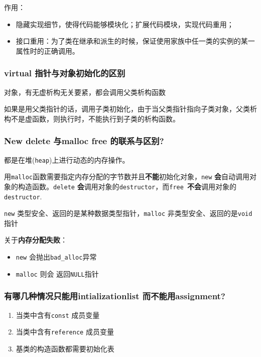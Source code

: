 \documentclass[UTF8,a4paper,8pt]{ctexart}
\begin{document}
			作用：
			\begin{itemize}[itemindent = 1em]
				\item  隐藏实现细节，使得代码能够模块化；扩展代码模块，实现代码重用；
				\item  接口重用：为了类在继承和派生的时候，保证使用家族中任一类的实例的某一属性时的正确调用。
			\end{itemize}
		
		\subsubsection{virtual 指针与对象初始化的区别}
			对象，有无虚析构无关要紧，都会调用父类析构函数
			
			如果是用父类指针的话，调用子类初始化，由于当父类指针指向子类对象，父类析构不是虚函数，则执行时，不能执行到子类的析构函数。
			
		\subsubsection{New delete 与malloc free 的联系与区别?}
			都是在堆(\verb|heap|)上进行动态的内存操作。
			
			用\verb|malloc|函数需要指定内存分配的字节数并且\textbf{不能}初始化对象，\verb|new| \textbf{会}自动调用对象的构造函数。\verb|delete| \textbf{会}调用对象的\verb|destructor|，而\verb|free |\textbf{不会}调用对象的\verb|destructor|.
			
			\verb|new| 类型安全、返回的是某种数据类型指针，\verb|malloc| 非类型安全、返回的是\verb|void|指针
			
			关于\textbf{内存分配失败}：
				\begin{itemize}[itemindent = 2em]
					\item \verb|new| 会抛出\verb|bad_alloc|异常
					\item \verb|malloc| 则会 返回\verb|NULL|指针
				\end{itemize}
				
		\subsubsection{有哪几种情况只能用intializationlist 而不能用assignment?}
			\begin{enumerate}
				\item 当类中含有\verb|const| 成员变量
				\item 当类中含有\verb|reference| 成员变量
				\item 基类的构造函数都需要初始化表
			\end{enumerate}
\end{document}
